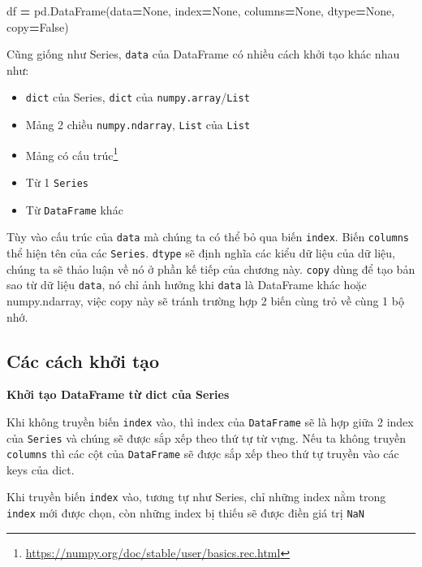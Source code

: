 \documentclass[
]{book}
\newenvironment{Shaded}{\begin{snugshade}}{\end{snugshade}}
\newcommand{\NormalTok}[1]{#1}
\newcommand{\OperatorTok}[1]{\textcolor[rgb]{0.81,0.36,0.00}{\textbf{#1}}}
\newcommand{\VariableTok}[1]{\textcolor[rgb]{0.00,0.00,0.00}{#1}}
\providecommand{\tightlist}{%
  \setlength{\itemsep}{0pt}\setlength{\parskip}{0pt}}
\renewcommand{\href}[2]{#2\footnote{\url{#1}}}
\begin{document}
\begin{Shaded}
\begin{Highlighting}[]
\NormalTok{df }\OperatorTok{=}\NormalTok{ pd.DataFrame(data}\OperatorTok{=}\VariableTok{None}\NormalTok{, index}\OperatorTok{=}\VariableTok{None}\NormalTok{, columns}\OperatorTok{=}\VariableTok{None}\NormalTok{, dtype}\OperatorTok{=}\VariableTok{None}\NormalTok{, copy}\OperatorTok{=}\VariableTok{False}\NormalTok{)}
\end{Highlighting}
\end{Shaded}

Cũng giống như Series, \texttt{data} của DataFrame có nhiều cách khởi tạo khác nhau như:

\begin{itemize}
\tightlist
\item
  \texttt{dict} của Series, \texttt{dict} của \texttt{numpy.array}/\texttt{List}
\item
  Mảng 2 chiều \texttt{numpy.ndarray}, \texttt{List} của \texttt{List}
\item
  \href{https://numpy.org/doc/stable/user/basics.rec.html}{Mảng có cấu trúc}
\item
  Từ 1 \texttt{Series}
\item
  Từ \texttt{DataFrame} khác
\end{itemize}

Tùy vào cấu trúc của \texttt{data} mà chúng ta có thể bỏ qua biến \texttt{index}. Biến \texttt{columns} thể hiện tên
của các \texttt{Series}. \texttt{dtype} sẽ định nghĩa các kiểu dữ liệu của dữ liệu, chúng ta sẽ thảo luận về nó
ở phần kế tiếp của chương này. \texttt{copy} dùng để tạo bản sao từ dữ liệu \texttt{data}, nó chỉ ảnh hưởng khi
\texttt{data} là DataFrame khác hoặc numpy.ndarray, việc copy này sẽ tránh trường hợp 2 biến cùng trỏ về
cùng 1 bộ nhớ.

\subsection{Các cách khởi tạo}\label{cuxe1c-cuxe1ch-khux1edfi-tux1ea1o-1}

\textbf{Khởi tạo DataFrame từ dict của Series}

Khi không truyền biến \texttt{index} vào, thì index của \texttt{DataFrame} sẽ là hợp giữa 2 index của \texttt{Series} và
chúng sẽ được sắp xếp theo thứ tự từ vựng. Nếu ta không truyền \texttt{columns} thì các cột của \texttt{DataFrame} sẽ
được sắp xếp theo thứ tự truyền vào các keys của dict.

Khi truyền biến \texttt{index} vào, tương tự như Series, chỉ những index nằm trong \texttt{index} mới được chọn, còn
những index bị thiếu sẽ được điền giá trị \texttt{NaN}
\end{document}
